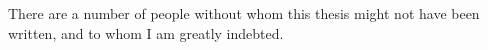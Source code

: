 \documentclass[
11pt, 
oneside,
english,
onehalfspacing,
onehalfspacing,
parskip,
headsepline,
]{MastersDoctoralThesis}
\begin{document}
\begin{acknowledgements}
\addchaptertocentry{\acknowledgementname} %
There are a number of people without whom this thesis might not have been written,
and to whom I am greatly indebted.\\






\end{acknowledgements}
\end{document}
